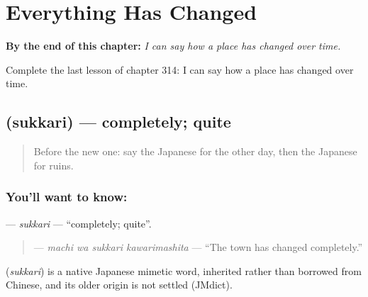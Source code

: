 
\chapter{Everything Has Changed}
\label{ch:ja-everything-has-changed}

\begin{chapteropening}
\textbf{By the end of this chapter:} \emph{I can say how a place has changed over time.}

Complete the last lesson of chapter 314: I can say how a place has changed over time.
\end{chapteropening}

\section[\texorpdfstring{\ja{すっかり} (sukkari)}{すっかり (sukkari)}]{ (sukkari) — completely; quite}

\label{lesson:JA-C314-sukkari}



\begin{quote}
Before the new one: say the Japanese for the other day, then the Japanese for ruins.
\end{quote}

\subsection*{You'll want to know: }
\textbf{} — \emph{sukkari} — \textquotedblleft{}completely; quite\textquotedblright{}.

\begin{quote}
\textbf{  } — \emph{machi wa sukkari kawarimashita} — \textquotedblleft{}The town has changed completely.\textquotedblright{}
\end{quote}

\begin{cousinweb}
\textbf{} (\emph{sukkari}) is a native Japanese mimetic word, inherited rather than borrowed from Chinese, and its older origin is not settled (JMdict).
\end{cousinweb}

